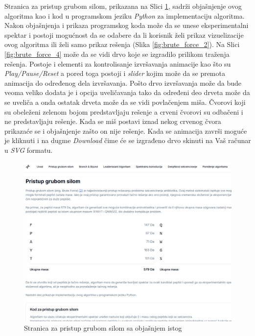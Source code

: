 \documentclass[12pt,oneside]{memoir}
\begin{document}
Stranica za pristup grubom silom, prikazana na Slici \ref{fig:brute_force_1}, sadrži objašnjenje ovog algoritma kao i kod u programskom jeziku \emph{Python} za implementaciju algoritma.
Nakon objašnjenja i prikaza programskog koda može da se unese eksperimentalni spektar i postoji mogućnost da se odabere da li korisnik želi prikaz vizuelizacije ovog algoritma ili želi samo prikaz rešenja (Slika \ref{fig:brute_force_2}). Na Slici \ref{fig:brute_force_4} može da se vidi drvo koje se izgradilo prilikom traženja rešenja. Postoje i elementi za kontrolisanje izvršavanja animacije kao što su \emph{Play/Pause/Reset} a pored toga postoji i \emph{slider} kojim može da se premota animacija do određenog dela izvršavanja. Pošto drvo izvršavanja može da bude veoma veliko dodata je i opcija uveličavanja tako da određeni deo drveta može da se uveliča a onda ostatak drveta može da se vidi povlačenjem miša. Čvorovi koji su obeleženi zelenom bojom predstavljaju rešenje a crveni čvorovi su odbačeni i ne predstavljaju rešenje. Kada se miš postavi iznad nekog crvenog čvora prikazaće se i objašnjenje zašto on nije rešenje.
Kada se animacija završi moguće je kliknuti i na dugme \emph{Download} čime će se izgrađeno drvo skinuti na Vaš računar u \emph{SVG} formatu.
\begin{figure}[h]
\centering
\includegraphics[width=1\textwidth]{images/brute_force_1.png}
\caption{Stranica za pristup grubom silom sa objašnjem istog}
\label{fig:brute_force_1}
\end{figure}
\end{document}

